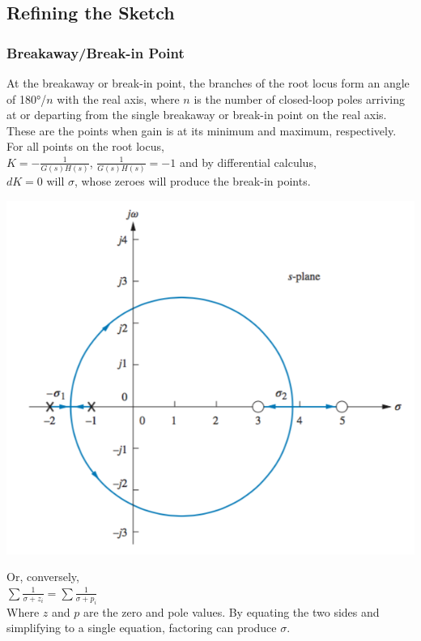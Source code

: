 \documentclass[11pt]{article}
\begin{document}
    \subsection{Refining the Sketch}

    \subsubsection{Breakaway/Break-in Point}

    At the breakaway or break-in point, the branches of the root locus form an angle of 180°/$n$ with the real axis, where $n$ is the number of closed-loop poles arriving at or departing from the single breakaway or break-in point on the real axis. These are the points when gain is at its minimum and maximum, respectively. \\
        
    For all points on the root locus, \\
    
    $K = -\frac{1}{G(s)H(s)}$, $\frac{1}{G(s)H(s)} = -1$ and by differential calculus, \\
    
    $dK = 0$ will $\sigma$, whose zeroes will produce the break-in points.

    \begin{center}
        \includegraphics[width=300 px]{img/breakpoints} \\
    \end{center}

    Or, conversely, \\

    $\sum \frac{1}{\sigma + z_i} = \sum \frac{1}{\sigma + p_i}$ \\

    Where $z$ and $p$ are the zero and pole values. By equating the two sides and simplifying to a single equation, factoring can produce $\sigma$.
\end{document}
